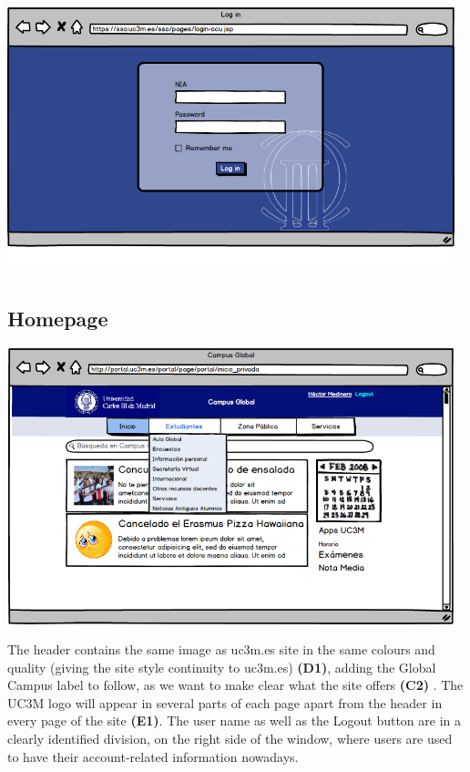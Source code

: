 \documentclass{article}
\begin{document}
\begin{center}
\includegraphics[width=13cm, height=8cm, keepaspectratio]{mockup_login}
\end{center}

\subsection{Homepage}

\begin{center}
\includegraphics[width=13cm, height=8cm, keepaspectratio]{mockup_homepage_top}
\end{center}

The header contains the same image as uc3m.es site in the same colours and quality (giving the site style continuity to uc3m.es) \textbf{(D1)}, adding the Global Campus label to follow, as we want to make clear what the site offers \textbf{(C2)} . The UC3M logo will appear in several parts of each page apart from the header in every page of the site \textbf{(E1)}. The user name as well as the Logout button are in a clearly identified division, on the right side of the window, where users are used to have their account-related information nowadays. 
\end{document}
